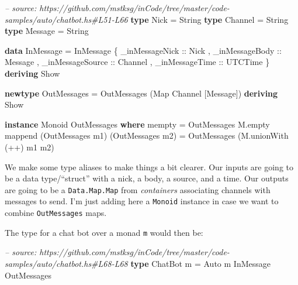 \documentclass[]{article}
\newenvironment{Shaded}{\begin{snugshade}}{\end{snugshade}}
\newcommand{\CommentTok}[1]{\textcolor[rgb]{0.56,0.35,0.01}{\textit{#1}}}
\newcommand{\DataTypeTok}[1]{\textcolor[rgb]{0.13,0.29,0.53}{#1}}
\newcommand{\FunctionTok}[1]{\textcolor[rgb]{0.00,0.00,0.00}{#1}}
\newcommand{\KeywordTok}[1]{\textcolor[rgb]{0.13,0.29,0.53}{\textbf{#1}}}
\newcommand{\NormalTok}[1]{#1}
\newcommand{\OtherTok}[1]{\textcolor[rgb]{0.56,0.35,0.01}{#1}}
\begin{document}
\begin{Shaded}
\begin{Highlighting}[]
\CommentTok{-- source: https://github.com/mstksg/inCode/tree/master/code-samples/auto/chatbot.hs#L51-L66}
\KeywordTok{type} \DataTypeTok{Nick}    \FunctionTok{=} \DataTypeTok{String}
\KeywordTok{type} \DataTypeTok{Channel} \FunctionTok{=} \DataTypeTok{String}
\KeywordTok{type} \DataTypeTok{Message} \FunctionTok{=} \DataTypeTok{String}

\KeywordTok{data} \DataTypeTok{InMessage} \FunctionTok{=} \DataTypeTok{InMessage}\NormalTok{ \{}\OtherTok{ _inMessageNick   ::} \DataTypeTok{Nick}
\NormalTok{                           ,}\OtherTok{ _inMessageBody   ::} \DataTypeTok{Message}
\NormalTok{                           ,}\OtherTok{ _inMessageSource ::} \DataTypeTok{Channel}
\NormalTok{                           ,}\OtherTok{ _inMessageTime   ::} \DataTypeTok{UTCTime}
\NormalTok{                           \} }\KeywordTok{deriving} \DataTypeTok{Show}

\KeywordTok{newtype} \DataTypeTok{OutMessages} \FunctionTok{=} \DataTypeTok{OutMessages}\NormalTok{ (}\DataTypeTok{Map} \DataTypeTok{Channel}\NormalTok{ [}\DataTypeTok{Message}\NormalTok{]) }\KeywordTok{deriving} \DataTypeTok{Show}

\KeywordTok{instance} \DataTypeTok{Monoid} \DataTypeTok{OutMessages} \KeywordTok{where}
\NormalTok{    mempty  }\FunctionTok{=} \DataTypeTok{OutMessages}\NormalTok{ M.empty}
\NormalTok{    mappend (}\DataTypeTok{OutMessages}\NormalTok{ m1) (}\DataTypeTok{OutMessages}\NormalTok{ m2)}
            \FunctionTok{=} \DataTypeTok{OutMessages}\NormalTok{ (M.unionWith (}\FunctionTok{++}\NormalTok{) m1 m2)}
\end{Highlighting}
\end{Shaded}

We make some type aliases to make things a bit clearer. Our inputs are going to
be a data type/``struct'' with a nick, a body, a source, and a time. Our outputs
are going to be a \texttt{Data.Map.Map} from \emph{containers} associating
channels with messages to send. I'm just adding here a \texttt{Monoid} instance
in case we want to combine \texttt{OutMessages} maps.

The type for a chat bot over a monad \texttt{m} would then be:

\begin{Shaded}
\begin{Highlighting}[]
\CommentTok{-- source: https://github.com/mstksg/inCode/tree/master/code-samples/auto/chatbot.hs#L68-L68}
\KeywordTok{type} \DataTypeTok{ChatBot}\NormalTok{ m }\FunctionTok{=} \DataTypeTok{Auto}\NormalTok{ m }\DataTypeTok{InMessage} \DataTypeTok{OutMessages}
\end{Highlighting}
\end{Shaded}
\end{document}

